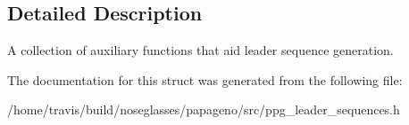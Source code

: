 \subsection{Detailed Description}
A collection of auxiliary functions that aid leader sequence generation. 

The documentation for this struct was generated from the following file\-:\begin{DoxyCompactItemize}
\item 
/home/travis/build/noseglasses/papageno/src/ppg\-\_\-leader\-\_\-sequences.\-h\end{DoxyCompactItemize}
